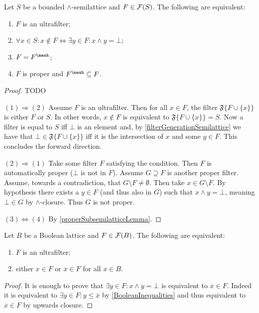 \begin{proposition} \label{ultrafilterCriteria}
Let $S$ be a bounded $\wedge$-semilattice and $F\in \operatorname{\mathcal{F}}(S)$. The following are equivalent:
\begin{enumerate}
\item $F$ is an ultrafilter;
\item $\forall x\in S: x\notin F \iff \exists y\in F: x\wedge y = \bot$;
\item $F = F^\mesh$;
\item $F$ is proper and $F^\mesh \subseteq F$.
\end{enumerate}
\end{proposition}
\begin{proof}
TODO

$(1)\Rightarrow (2)$ Assume $F$ is an ultrafilter. Then for all $x\in F$, the filter $\mathfrak{F}\big\{F\cup \{x\}\big\}$ is either $F$ or $S$. In other words, $x\notin F$ is equivalent to $\mathfrak{F}\big\{F\cup \{x\}\big\} = S$. Now a filter is equal to $S$ iff $\bot$ is an element and, by \ref{filterGenerationSemilattice} we have that $\bot \in \mathfrak{F}\big\{F\cup \{x\}\big\}$ iff it is the intersection of $x$ and some $y\in F$. This concludes the forward direction.

$(2)\Rightarrow (1)$ Take some filter $F$ satisfying the condition. Then $F$ is automatically proper ($\bot$ is not in $F$). Assume $G\supseteq F$ is another proper filter. Assume, towards a contradiction, that $G\setminus F \neq \emptyset$. Then take $x\in G\setminus F$. By hypothesis there exists a $y\in F$ (and thus also in $G$) such that $x\wedge y = \bot$, meaning $\bot \in G$ by $\wedge$-closure. Thus $G$ is not proper.

$(3) \Leftrightarrow (4)$ By \ref{properSubsemilatticeLemma}.
\end{proof}
\begin{corollary} \label{BooleanUltrafilterDisjunction}
Let $B$ be a Boolean lattice and $F\in \operatorname{\mathcal{F}}(B)$. The following are equivalent:
\begin{enumerate}
\item $F$ is an ultrafilter;
\item either $x\in F$ or $\overline{x}\in F$ for all $x\in B$.
\end{enumerate}
\end{corollary}
\begin{proof}
It is enough to prove that $\exists y\in F: x\wedge y = \bot$ is equivalent to $\overline{x}\in F$. Indeed it is equivalent to $\exists y\in F: y \leq \overline{x}$ by \ref{BooleanInequalities} and thus equivalent to $\overline{x}\in F$ by upwards closure.
\end{proof}


